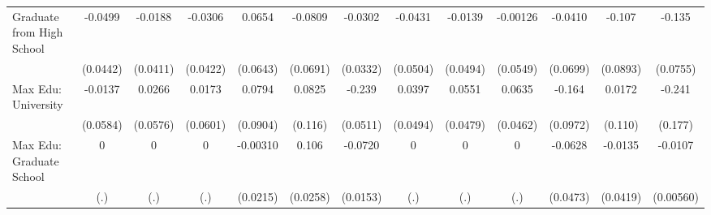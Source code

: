 {\begin{tabular}{l*{12}{c}}
\addlinespace
Graduate from High School&     -0.0499         &     -0.0188         &     -0.0306         &      0.0654         &     -0.0809         &     -0.0302         &     -0.0431         &     -0.0139         &    -0.00126         &     -0.0410         &      -0.107         &      -0.135         \\
            &    (0.0442)         &    (0.0411)         &    (0.0422)         &    (0.0643)         &    (0.0691)         &    (0.0332)         &    (0.0504)         &    (0.0494)         &    (0.0549)         &    (0.0699)         &    (0.0893)         &    (0.0755)         \\
\addlinespace
Max Edu: University&     -0.0137         &      0.0266         &      0.0173         &      0.0794         &      0.0825         &      -0.239\sym{***}&      0.0397         &      0.0551         &      0.0635         &      -0.164         &      0.0172         &      -0.241         \\
            &    (0.0584)         &    (0.0576)         &    (0.0601)         &    (0.0904)         &     (0.116)         &    (0.0511)         &    (0.0494)         &    (0.0479)         &    (0.0462)         &    (0.0972)         &     (0.110)         &     (0.177)         \\
\addlinespace
Max Edu: Graduate School&           0         &           0         &           0         &    -0.00310         &       0.106\sym{***}&     -0.0720\sym{***}&           0         &           0         &           0         &     -0.0628         &     -0.0135         &     -0.0107         \\
            &         (.)         &         (.)         &         (.)         &    (0.0215)         &    (0.0258)         &    (0.0153)         &         (.)         &         (.)         &         (.)         &    (0.0473)         &    (0.0419)         &   (0.00560)         \\
\bottomrule
\end{tabular}
}
